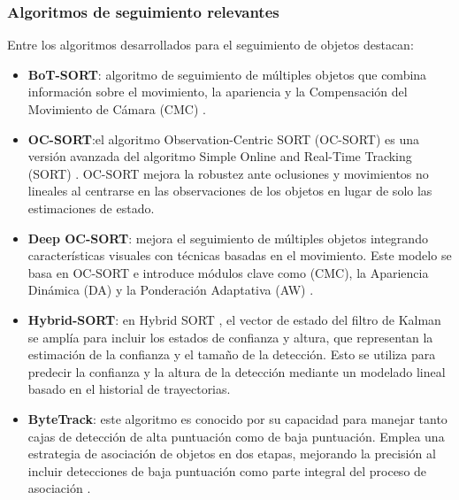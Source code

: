\subsubsection{Algoritmos de seguimiento relevantes}
Entre los algoritmos desarrollados para el seguimiento de objetos destacan:
\begin{itemize}
    \item \textbf{BoT-SORT}: algoritmo de seguimiento de múltiples objetos que combina información sobre el movimiento, la apariencia y la Compensación del Movimiento de Cámara (CMC) \cite{BotSORT}.

    \item \textbf{OC-SORT}:el algoritmo Observation-Centric SORT (OC-SORT) \cite{OCSORT} es una versión avanzada del algoritmo Simple Online and Real-Time Tracking (SORT) \cite{SORT}. OC-SORT mejora la robustez ante oclusiones y movimientos no lineales al centrarse en las observaciones de los objetos en lugar de solo las estimaciones de estado.

    \item \textbf{Deep OC-SORT}: mejora el seguimiento de múltiples objetos integrando características visuales con técnicas basadas en el movimiento. Este modelo se basa en OC-SORT e introduce módulos clave como (CMC), la Apariencia Dinámica (DA) y la Ponderación Adaptativa (AW) \cite{DeepOCSORT}.

    \item \textbf{Hybrid-SORT}: en Hybrid SORT \cite{HybridSORT}, el vector de estado del filtro de Kalman se amplía para incluir los estados de confianza y altura, que representan la estimación de la confianza y el tamaño de la detección. Esto se utiliza para predecir la confianza y la altura de la detección mediante un modelado lineal basado en el historial de trayectorias.

    \item \textbf{ByteTrack}: este algoritmo es conocido por su capacidad para manejar tanto cajas de detección de alta puntuación como de baja puntuación. Emplea una estrategia de asociación de objetos en dos etapas, mejorando la precisión al incluir detecciones de baja puntuación como parte integral del proceso de asociación \cite{ByteTrack}.
\end{itemize}